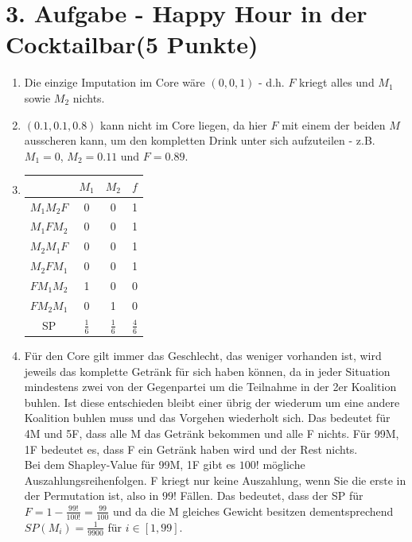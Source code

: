\documentclass[a4paper, 11pt]{article}
\begin{document}
\section*{3. Aufgabe - Happy Hour in der Cocktailbar\hfill {\small (5 Punkte)}}
\begin{enumerate}
\item
Die einzige Imputation im Core wäre $(0,0,1)$ - d.h. $F$ kriegt alles und $M_1$ sowie $M_2$ nichts.
\item 
$(0.1,0.1,0.8)$ kann nicht im Core liegen, da hier $F$ mit einem der beiden $M$ ausscheren kann, um den kompletten Drink unter sich aufzuteilen - z.B. $M_1 = 0$, $M_2 =0.11$ und $F=0.89$.
\item
\begin{tabular}{c || c c c}
& $M_1$ & $M_2$ & $f$ \\ \hline
$M_1M_2F$ & 0 & 0 & 1 \\
$M_1FM_2 $ & 0 & 0 & 1 \\
$M_2M_1F$ & 0 & 0 & 1 \\
$M_2FM_1$ & 0 & 0 & 1 \\
$FM_1M_2$ & 1 & 0 & 0 \\
$FM_2M_1$ & 0 & 1 & 0 \\
SP & $\frac{1}{6}$ & $\frac{1}{6}$ & $\frac{4}{6}$ \\
\end{tabular}
\item
Für den Core gilt immer das Geschlecht, das weniger vorhanden ist, wird jeweils das komplette Getränk für sich haben können, da in jeder Situation mindestens zwei von der Gegenpartei um die Teilnahme in der 2er Koalition buhlen. Ist diese entschieden bleibt einer übrig der wiederum um eine andere Koalition buhlen muss und das Vorgehen wiederholt sich. Das bedeutet für 4M und 5F, dass alle M das Getränk bekommen und alle F nichts. Für 99M, 1F bedeutet es, dass F ein Getränk haben wird und der Rest nichts.\\

Bei dem Shapley-Value für 99M, 1F gibt es $100!$ mögliche Auszahlungsreihenfolgen. F kriegt nur keine Auszahlung, wenn Sie die erste in der Permutation ist, also in $99!$ Fällen. Das bedeutet, dass der SP für $F = 1 - \frac{99!}{100!} = \frac{99}{100}$ und da die M gleiches Gewicht besitzen dementsprechend $SP(M_i) = \frac{1}{9900}$ für $i \in [1,99]$.\\


\end{enumerate}
\end{document}
